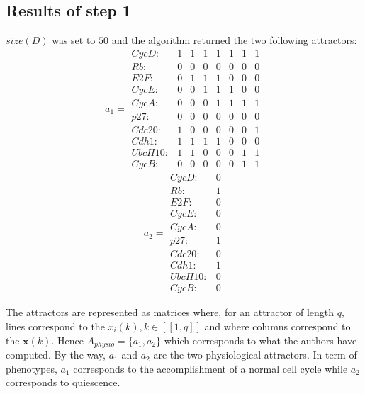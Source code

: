 \documentclass[oneside,a4paper,onecolumn,notitlepage]{article}
\begin{document}
\subsection*{Results of step 1}
$size(D)$ was set to $50$ and the algorithm returned the two following attractors:
\begin{equation*}
a_{1}=
\begin{matrix}
CycD:&1&1&1&1&1&1&1\\
Rb:&0&0&0&0&0&0&0\\
E2F:&0&1&1&1&0&0&0\\
CycE:&0&0&1&1&1&0&0\\
CycA:&0&0&0&1&1&1&1\\
p27:&0&0&0&0&0&0&0\\
Cdc20:&1&0&0&0&0&0&1\\
Cdh1:&1&1&1&1&0&0&0\\
UbcH10:&1&1&0&0&0&1&1\\
CycB:&0&0&0&0&0&1&1
\end{matrix}
\end{equation*}
\begin{equation*}
a_{2}=
\begin{matrix}
CycD:&0\\
Rb:&1\\
E2F:&0\\
CycE:&0\\
CycA:&0\\
p27:&1\\
Cdc20:&0\\
Cdh1:&1\\
UbcH10:&0\\
CycB:&0
\end{matrix}
\end{equation*}

The attractors are represented as matrices where, for an attractor of length $q$, lines correspond to the $x_i(k), k\in [\![1,q]\!]$ and where columns correspond to the $\boldsymbol{x}(k)$.
Hence $A_{physio}=\lbrace a_{1},a_{2}\rbrace$ which corresponds to what the authors have computed. By the way, $a_{1}$ and $a_{2}$ are the two physiological attractors. In term of phenotypes, $a_{1}$ corresponds to the accomplishment of a normal cell cycle while $a_{2}$ corresponds to quiescence.
\end{document}
